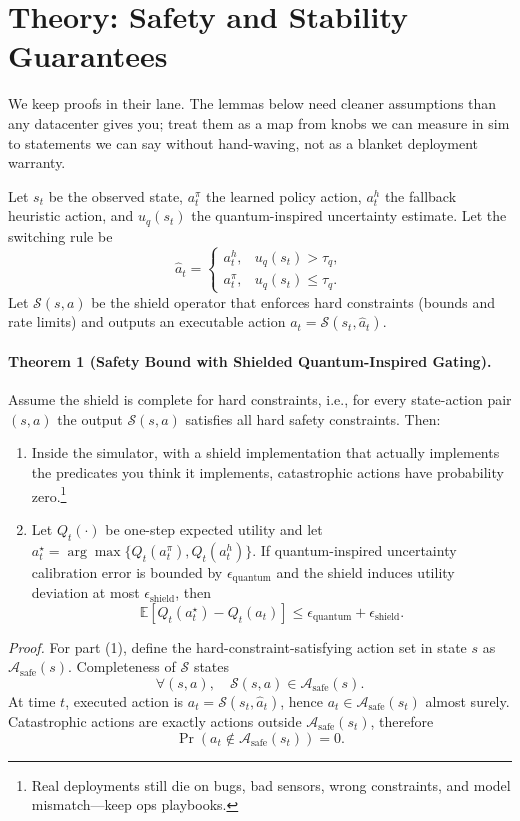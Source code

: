 \section{Theory: Safety and Stability Guarantees}

We keep proofs in their lane. The lemmas below need cleaner assumptions than any datacenter gives you; treat them as a map from knobs we can measure in sim to statements we can say without hand-waving, not as a blanket deployment warranty.

Let $s_t$ be the observed state, $a_t^{\pi}$ the learned policy action, $a_t^{h}$ the fallback heuristic action, and $u_q(s_t)$ the quantum-inspired uncertainty estimate. Let the switching rule be
\[
\hat a_t=
\begin{cases}
a_t^{h}, & u_q(s_t)>\tau_q,\\
a_t^{\pi}, & u_q(s_t)\le\tau_q.
\end{cases}
\]
Let $\mathcal{S}(s,a)$ be the shield operator that enforces hard constraints (bounds and rate limits) and outputs an executable action $a_t=\mathcal{S}(s_t,\hat a_t)$.

\paragraph{Theorem 1 (Safety Bound with Shielded Quantum-Inspired Gating).}
Assume the shield is complete for hard constraints, i.e., for every state-action pair $(s,a)$ the output $\mathcal{S}(s,a)$ satisfies all hard safety constraints. Then:
\begin{enumerate}
	\item Inside the simulator, with a shield implementation that actually implements the predicates you think it implements, catastrophic actions have probability zero.\footnote{Real deployments still die on bugs, bad sensors, wrong constraints, and model mismatch---keep ops playbooks.}
	\item Let $Q_t(\cdot)$ be one-step expected utility and let $a_t^{\star}=\arg\max\{Q_t(a_t^{\pi}),Q_t(a_t^h)\}$. If quantum-inspired uncertainty calibration error is bounded by $\epsilon_{\text{quantum}}$ and the shield induces utility deviation at most $\epsilon_{\text{shield}}$, then
	\[
	\mathbb{E}[Q_t(a_t^{\star})-Q_t(a_t)] \le \epsilon_{\text{quantum}}+\epsilon_{\text{shield}}.
	\]
\end{enumerate}

\textit{Proof.}
For part (1), define the hard-constraint-satisfying action set in state $s$ as $\mathcal{A}_{\mathrm{safe}}(s)$. Completeness of $\mathcal{S}$ states
\[
\forall (s,a),\quad \mathcal{S}(s,a)\in \mathcal{A}_{\mathrm{safe}}(s).
\]
At time $t$, executed action is $a_t=\mathcal{S}(s_t,\hat a_t)$, hence $a_t\in\mathcal{A}_{\mathrm{safe}}(s_t)$ almost surely. Catastrophic actions are exactly actions outside $\mathcal{A}_{\mathrm{safe}}(s_t)$, therefore
\[
\Pr(a_t\notin\mathcal{A}_{\mathrm{safe}}(s_t))=0.
\]

